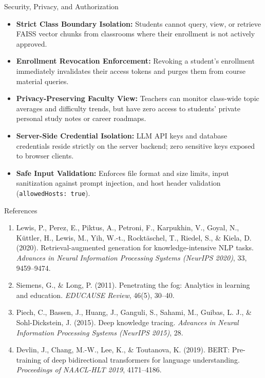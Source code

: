 \documentclass[aspectratio=169,10pt]{beamer}
\begin{document}
\begin{frame}{Security, Privacy, and Authorization}
  \begin{itemize}
    \item \textbf{Strict Class Boundary Isolation:} Students cannot query, view, or retrieve FAISS vector chunks from classrooms where their enrollment is not actively approved.
    \item \textbf{Enrollment Revocation Enforcement:} Revoking a student's enrollment immediately invalidates their access tokens and purges them from course material queries.
    \item \textbf{Privacy-Preserving Faculty View:} Teachers can monitor class-wide topic averages and difficulty trends, but have zero access to students' private personal study notes or career roadmaps.
    \item \textbf{Server-Side Credential Isolation:} LLM API keys and database credentials reside strictly on the server backend; zero sensitive keys exposed to browser clients.
    \item \textbf{Safe Input Validation:} Enforces file format and size limits, input sanitization against prompt injection, and host header validation (\texttt{allowedHosts: true}).
  \end{itemize}
\end{frame}

\begin{frame}{References}
  \footnotesize
  \begin{enumerate}
    \item Lewis, P., Perez, E., Piktus, A., Petroni, F., Karpukhin, V., Goyal, N., K\"uttler, H., Lewis, M., Yih, W.-t., Rockt\"aschel, T., Riedel, S., \& Kiela, D. (2020). Retrieval-augmented generation for knowledge-intensive NLP tasks. \textit{Advances in Neural Information Processing Systems (NeurIPS 2020)}, 33, 9459--9474.
    \item Siemens, G., \& Long, P. (2011). Penetrating the fog: Analytics in learning and education. \textit{EDUCAUSE Review}, 46(5), 30--40.
    \item Piech, C., Bassen, J., Huang, J., Ganguli, S., Sahami, M., Guibas, L. J., \& Sohl-Dickstein, J. (2015). Deep knowledge tracing. \textit{Advances in Neural Information Processing Systems (NeurIPS 2015)}, 28.
    \item Devlin, J., Chang, M.-W., Lee, K., \& Toutanova, K. (2019). BERT: Pre-training of deep bidirectional transformers for language understanding. \textit{Proceedings of NAACL-HLT 2019}, 4171--4186.
  \end{enumerate}
\end{frame}
\end{document}
